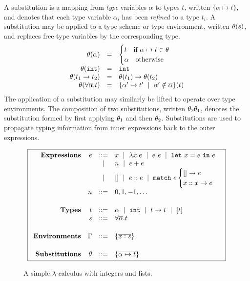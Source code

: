 A substitution is a mapping from \emph{type} variables $\alpha$ to types
$t$, written $\{\overline{\alpha \mapsto t}\}$, and denotes that each
type variable $\alpha_i$ has been \emph{refined} to a type $t_i$.
%
A substitution may be applied to a type scheme or type environment, written
$\theta(s)$, and replaces free type variables by the corresponding type.
%
\[
\begin{array}{rcl}
\theta(\alpha) &=& \begin{cases}
  t \quad \text{if } \alpha \mapsto t \in \theta \\
  \alpha \quad \text{otherwise}
  \end{cases} \\
\theta(\mathtt{int})  &=& \mathtt{int} \\
\theta(t_1 \rightarrow t_2) &=& \theta(t_1) \rightarrow \theta(t_2)\\
\theta(\forall \overline{\alpha}. t) &=& \{\alpha' \mapsto t' \ \mid\  \alpha' \notin \overline{\alpha}\}(t)
\end{array}
\]
%
The application of a substitution may similarly be lifted to operate
over type environments.
%
The composition of two substitutions, written $\theta_2\theta_1$, denotes
the substitution formed by first applying $\theta_1$ and then $\theta_2$.
%
Substitutions are used to propagate typing information from inner expressions
back to the outer expressions.



\begin{figure}
\centering
\[
\boxed{
\begin{array}{rrcl}
\mathbf{Expressions}
& e & ::=    & x \spmid \efun{x}{e} \spmid \eapp{e}{e} \spmid \elet{x}{e}{e} \\
&   & \spmid & n \spmid \eplus{e}{e}\\
&   & \spmid & \enil \spmid \econs{e}{e} \spmid \elcase{e}{e}{x}{x}{e} \\[0.05in]

& n & ::= &  0, 1, -1, \ldots \\[0.2in]

\mathbf{Types}
& t & ::= & \alpha \spmid %
            \tint \spmid \tarr{t}{t} \spmid %
            \tlist{t} \\
& s & ::= & \forall \overline{\alpha}. t \\[0.2in]

\mathbf{Environments}
& \Gamma & ::= & \{\overline{x:s}\}
\\[0.2in]

\mathbf{Substitutions}
& \tsu & ::= & \{\overline{\alpha \mapsto t}\}
\\
\end{array}
}
\]
\caption{A simple $\lambda$-calculus with integers and lists.}
\label{fig:intro:simple-lambda}
\end{figure}

